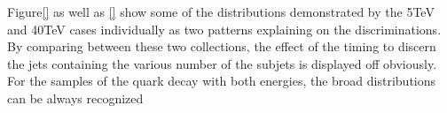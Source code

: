 Figure\ref{} as well as \ref{} show some of the distributions demonstrated by the 5TeV and 40TeV cases individually as two patterns explaining on the discriminations. By comparing between these two collections, the effect of the timing to discern the jets containing the various number of the subjets is displayed off obviously. For the samples of the quark decay with both energies, the broad distributions can be always recognized 


